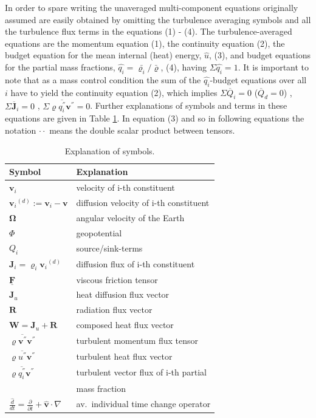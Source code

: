 In order to spare writing the unaveraged multi-component equations originally assumed are easily obtained by omitting the turbulence averaging symbols and all the turbulence flux terms in the equations (1) - (4). The turbulence-averaged equations are the momentum equation (1), the continuity equation (2), the budget equation for the mean internal (heat) energy, $\hat{u}$, (3), and budget equations for the partial mass fractions, $\hat{q_i} =\bar{\varrho_i} / \bar{\varrho} $, (4), having $\Sigma \hat{q_i}=1 $. It is important to note that as a mass control condition the sum of the $\hat{q_i}$-budget equations over all $i$ have to yield the continuity equation (2), which implies $ \Sigma \overline{Q}_i=0$ ($\overline{Q}_d=0$) , $\Sigma \overline{\mathbf{J}}_{i}= 0 $ , $ \Sigma \overline{\varrho q_{i}^{''}\mathbf{v}^{''}}=0 $. Further explanations of symbols and terms in these equations are given in Table \ref{symbol_table}. In equation (3) and so in following
equations the notation $\cdot\cdot$ means the double scalar product between tensors. 
\begin{table}
\caption{Explanation of symbols.}
\centering
\begin{tabular}{|l|l|}
\hline
Symbol & Explanation \\
\hline
$\mathbf{v}_i$        &      velocity of i-th constituent  \\
${\mathbf{v}_i}^{(d)}:=\mathbf{v}_i - \mathbf{v}$ & diffusion velocity of  i-th constituent\\
$\mathbf{\Omega}$ & angular velocity of the Earth\\
$\Phi$ & geopotential\\
$Q_i$ &  source/sink-terms\\
$\mathbf{J}_{i}=\varrho_i {\mathbf{v}_i}^{(d)} $ & diffusion flux of i-th constituent\\
$\underline{\mathbf{F}}$ & viscous friction tensor\\
$\mathbf{J}_u$ & heat diffusion flux vector\\
$\mathbf{R}$ & radiation flux vector\\
$\mathbf{W}=\mathbf{J}_u + \mathbf{R}$ & composed heat flux vector\\
$\overline{\varrho \mathbf{v}^{''}\mathbf{v}^{''}}$ & turbulent momentum flux tensor\\
$\overline{\varrho u^{''}\mathbf{v}^{''}}$ & turbulent heat flux vector\\
$\overline{\varrho q_{i}^{''}\mathbf{v}^{''}}$ & turbulent vector flux of i-th partial \\ & mass fraction \\
$ \frac{\hat{d}}{dt}= \frac{\partial}{ \partial t} + \hat{\mathbf{v}} \cdot \nabla $
& av.~individual time change operator\\
\hline
\end{tabular}
\label{symbol_table}
\end{table}
